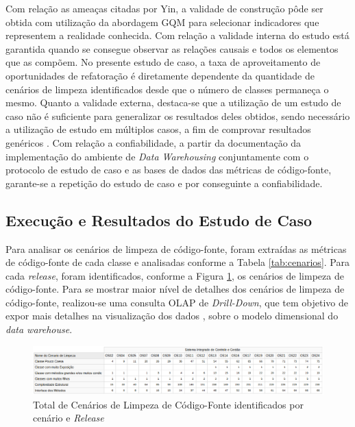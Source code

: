 Com relação as ameaças citadas por Yin, a validade de construção pôde ser obtida com utilização da abordagem GQM para selecionar indicadores que representem a realidade conhecida. Com relação a validade interna do estudo está garantida quando se consegue observar as relações causais e todos os elementos que as compõem. No presente estudo de caso, a taxa de aproveitamento de oportunidades de refatoração é diretamente dependente da quantidade de cenários de limpeza identificados desde que o número de classes permaneça o mesmo. Quanto a validade externa, destaca-se que a utilização de um estudo de caso não é suficiente para generalizar os resultados deles obtidos, sendo necessário a utilização de estudo em múltiplos casos, a fim de comprovar resultados genéricos \cite{yin2011applications}. Com relação a confiabilidade, a partir da documentação da implementação do ambiente de \textit{Data Warehousing} conjuntamente com o protocolo de estudo de caso e as bases de dados das métricas de código-fonte, garante-se a repetição do estudo de caso e por conseguinte a confiabilidade.

\subsection{Execução e Resultados do Estudo de Caso}
\label{sec:resultados}
Para analisar os cenários de limpeza de código-fonte, foram extraídas as métricas de código-fonte de cada classe e analisadas conforme a Tabela \ref{tab:cenarios}. Para cada \textit{release}, foram identificados, conforme a Figura \ref{fig:cenarios-release}, os cenários de limpeza de código-fonte. Para se mostrar maior nível de detalhes dos cenários de limpeza de código-fonte, realizou-se uma consulta OLAP de \textit{Drill-Down}, que tem objetivo de expor mais detalhes na visualização dos dados \cite{Kimball2002}, sobre o modelo dimensional do \textit{data warehouse}. 


\begin{figure}[ht!]
\centering
\includegraphics[keepaspectratio=true,scale=0.43]{figuras/total-cenario-tipo.eps}
\caption{Total de Cenários de Limpeza de Código-Fonte identificados por cenário e \textit{Release}}
\label{fig:cenarios-release}
\end{figure}
\FloatBarrier


